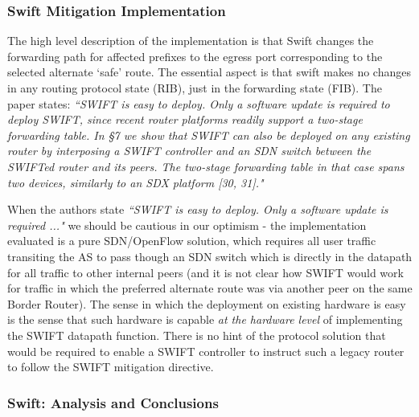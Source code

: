 \subsubsection{Swift Mitigation Implementation}
The high level description of the implementation is that Swift changes the forwarding path for affected prefixes to the egress port corresponding to the selected alternate `safe' route.
The essential aspect is that swift makes no changes in any routing protocol state (RIB), just in the forwarding state (FIB).
The paper states:
\emph{``SWIFT is easy to deploy.
	Only a software update is required to deploy SWIFT, since recent router platforms readily support a two-stage forwarding table.
	In §7 we show that SWIFT can also be deployed on any existing router by interposing a SWIFT controller and an SDN switch between the SWIFTed router and its peers.
	The two-stage forwarding table in that case spans two devices, similarly to an SDX platform [30, 31]."} 


\smallskip


When the authors state  \emph{``SWIFT is easy to deploy. Only a software update is required ..."} we should be cautious in our optimism - the implementation evaluated is a pure SDN/OpenFlow solution, which requires all user traffic transiting the AS to pass though an SDN switch which is directly in the datapath for all traffic to other internal peers (and it is not clear how SWIFT would work for traffic in which the preferred alternate route was via another peer on the same Border Router).  The sense in which the deployment on existing hardware is easy is the sense that such hardware is capable \emph{at the hardware level} of implementing the SWIFT datapath function.  There is no hint of the protocol solution that would be required to enable a SWIFT controller to instruct such a legacy router to follow the SWIFT mitigation directive.


\subsubsection{Swift: Analysis and Conclusions}



